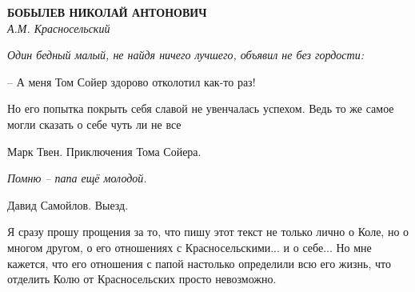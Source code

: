 \begin{center}{ \bf  БОБЫЛЕВ НИКОЛАЙ АНТОНОВИЧ}\\
{\it А.М. Красносельский} \\
\end{center}

\begin{flushright}
{\it Один бедный малый, не найдя ничего лучшего, объявил не без гордости:

 – А меня Том Сойер здорово отколотил как-то раз!

 Но его попытка покрыть себя  славой  не  увенчалась успехом. Ведь то же
 самое могли сказать о себе чуть ли не все }

Марк Твен. Приключения Тома Сойера.

{\it Помню – папа ещё молодой.}

Давид Самойлов. Выезд.
\end{flushright}

Я сразу прошу прощения  за то, что пишу этот текст не только лично о Коле, но о многом другом, о его отношениях с Красносельскими... и о себе... Но мне кажется, что его отношения с папой настолько определили всю его жизнь, что отделить Колю от Красносельских просто невозможно.

